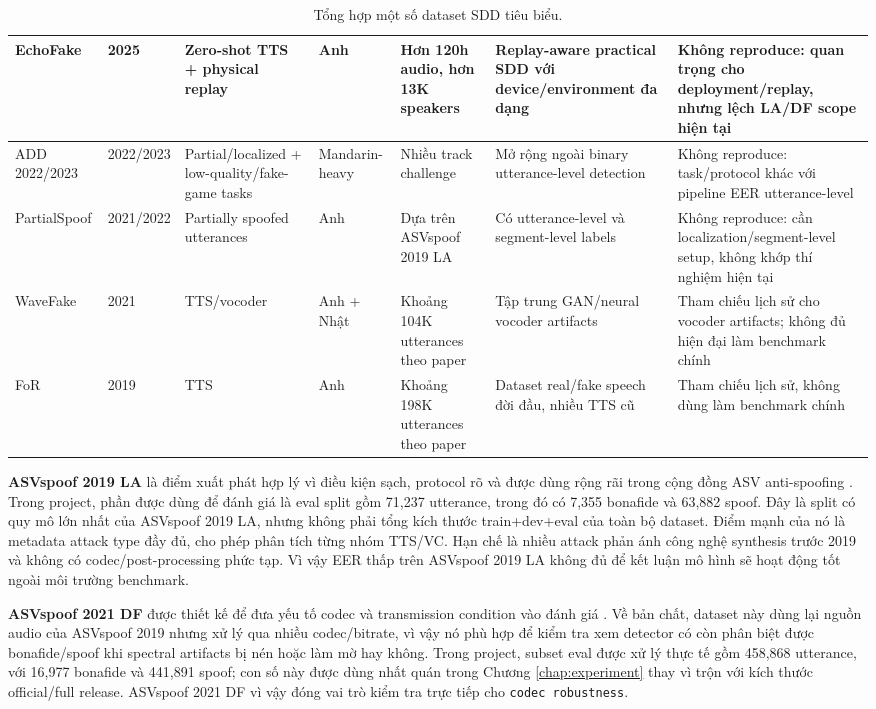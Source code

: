 \begin{table}[H]
\begin{adjustbox}{width=\textwidth}
\begin{tabular}{p{2.4cm}|p{1.5cm}|p{2.2cm}|p{1.5cm}|p{3.4cm}|p{3.8cm}|p{4.2cm}}
        \\ \hline
        EchoFake & 2025 & Zero-shot TTS + physical replay & Anh & Hơn 120h audio, hơn 13K speakers & Replay-aware practical SDD với device/environment đa dạng & Không reproduce: quan trọng cho deployment/replay, nhưng lệch LA/DF scope hiện tại \cite{echofake}
        \\ \hline
        ADD 2022/2023 & 2022/2023 & Partial/localized + low-quality/fake-game tasks & Mandarin-heavy & Nhiều track challenge & Mở rộng ngoài binary utterance-level detection & Không reproduce: task/protocol khác với pipeline EER utterance-level \cite{add2022,add2023}
        \\ \hline
        PartialSpoof & 2021/2022 & Partially spoofed utterances & Anh & Dựa trên ASVspoof 2019 LA & Có utterance-level và segment-level labels & Không reproduce: cần localization/segment-level setup, không khớp thí nghiệm hiện tại \cite{partialspoof}
        \\ \hline
        WaveFake & 2021 & TTS/vocoder & Anh + Nhật & Khoảng 104K utterances theo paper & Tập trung GAN/neural vocoder artifacts & Tham chiếu lịch sử cho vocoder artifacts; không đủ hiện đại làm benchmark chính
        \\ \hline
        FoR & 2019 & TTS & Anh & Khoảng 198K utterances theo paper & Dataset real/fake speech đời đầu, nhiều TTS cũ & Tham chiếu lịch sử, không dùng làm benchmark chính
    \end{tabular}
    \end{adjustbox}
    \caption{Tổng hợp một số dataset SDD tiêu biểu.}
    \label{tab:sdd-datasets}
\end{table}

\textbf{ASVspoof 2019 LA} là điểm xuất phát hợp lý vì điều kiện sạch, protocol rõ và được dùng rộng rãi trong cộng đồng ASV anti-spoofing \cite{asvspoof2019}. Trong project, phần được dùng để đánh giá là eval split gồm 71,237 utterance, trong đó có 7,355 bonafide và 63,882 spoof. Đây là split có quy mô lớn nhất của ASVspoof 2019 LA, nhưng không phải tổng kích thước train+dev+eval của toàn bộ dataset. Điểm mạnh của nó là metadata attack type đầy đủ, cho phép phân tích từng nhóm TTS/VC. Hạn chế là nhiều attack phản ánh công nghệ synthesis trước 2019 và không có codec/post-processing phức tạp. Vì vậy EER thấp trên ASVspoof 2019 LA không đủ để kết luận mô hình sẽ hoạt động tốt ngoài môi trường benchmark.

\textbf{ASVspoof 2021 DF} được thiết kế để đưa yếu tố codec và transmission condition vào đánh giá \cite{asvspoof2021}. Về bản chất, dataset này dùng lại nguồn audio của ASVspoof 2019 nhưng xử lý qua nhiều codec/bitrate, vì vậy nó phù hợp để kiểm tra xem detector có còn phân biệt được bonafide/spoof khi spectral artifacts bị nén hoặc làm mờ hay không. Trong project, subset eval được xử lý thực tế gồm 458,868 utterance, với 16,977 bonafide và 441,891 spoof; con số này được dùng nhất quán trong Chương \ref{chap:experiment} thay vì trộn với kích thước official/full release. ASVspoof 2021 DF vì vậy đóng vai trò kiểm tra trực tiếp cho \texttt{codec robustness}.

